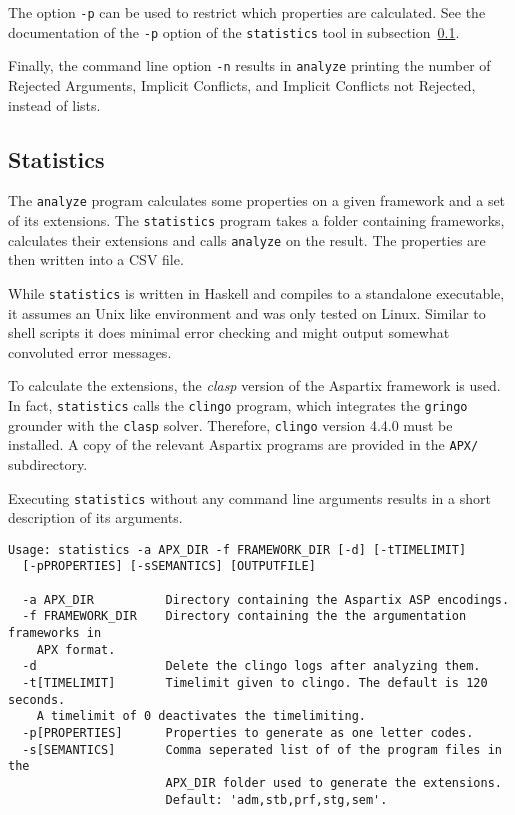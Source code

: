 \documentclass[parskip=half]{scrartcl}
\begin{document}
The option \texttt{-p} can be used to restrict which properties are
calculated. See the documentation of the \texttt{-p} option of the
\texttt{statistics} tool in subsection~\ref{statistics}.

Finally, the command line option \texttt{-n} results in \texttt{analyze}
printing the number of Rejected Arguments, Implicit Conflicts, and Implicit
Conflicts not Rejected, instead of lists.

\subsection{Statistics}
\label{statistics}

The \texttt{analyze} program calculates some properties on a given framework and
a set of its extensions. The \texttt{statistics} program takes a folder
containing frameworks, calculates their extensions and calls \texttt{analyze} on
the result. The properties are then written into a CSV file.

While \texttt{statistics} is written in Haskell and compiles to a standalone
executable, it assumes an Unix like environment and was only tested on Linux.
Similar to shell scripts it does minimal error checking and might output
somewhat convoluted error messages.

To calculate the extensions, the \emph{clasp} version of the Aspartix framework
is used.  In fact, \texttt{statistics} calls the \texttt{clingo} program, which
integrates the \texttt{gringo} grounder with the \texttt{clasp} solver. Therefore,
\texttt{clingo} version 4.4.0 must be installed.  A copy of the relevant
Aspartix programs are provided in the \texttt{APX/} subdirectory.

Executing \texttt{statistics} without any command line arguments results in a short
description of its arguments.
\begin{verbatim}
Usage: statistics -a APX_DIR -f FRAMEWORK_DIR [-d] [-tTIMELIMIT]
  [-pPROPERTIES] [-sSEMANTICS] [OUTPUTFILE]

  -a APX_DIR          Directory containing the Aspartix ASP encodings.
  -f FRAMEWORK_DIR    Directory containing the the argumentation frameworks in
    APX format.
  -d                  Delete the clingo logs after analyzing them.
  -t[TIMELIMIT]       Timelimit given to clingo. The default is 120 seconds.
    A timelimit of 0 deactivates the timelimiting.
  -p[PROPERTIES]      Properties to generate as one letter codes.
  -s[SEMANTICS]       Comma seperated list of of the program files in the
                      APX_DIR folder used to generate the extensions.
                      Default: 'adm,stb,prf,stg,sem'.
\end{verbatim}
\end{document}
